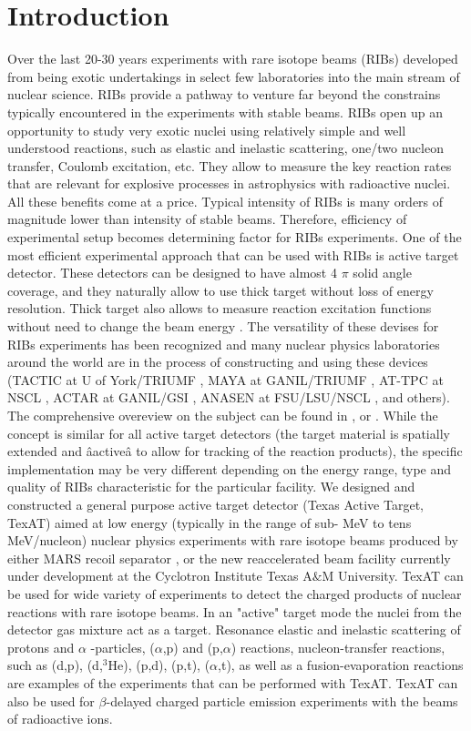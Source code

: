 \documentclass[final,number,sort&compress,5p,times,twocolumn]{elsarticle}
\begin{document}
\section{Introduction}

Over the last 20-30 years experiments with rare isotope beams (RIBs) developed from being
exotic undertakings in select few laboratories into the main stream of nuclear science. RIBs provide a
pathway to venture far beyond the constrains typically encountered in the experiments with stable beams.
RIBs open up an opportunity to study very exotic nuclei using relatively simple and well understood
reactions, such as elastic and inelastic scattering, one/two nucleon transfer, Coulomb excitation, etc. They
allow to measure the key reaction rates that are relevant for explosive processes in astrophysics with
radioactive nuclei. All these benefits come at a price. Typical intensity of RIBs is many orders of
magnitude lower than intensity of stable beams. Therefore, efficiency of experimental setup becomes
determining factor for RIBs experiments. One of the most efficient experimental approach that can be
used with RIBs is active target detector. These detectors can be designed to have almost 4 $\pi$  solid angle
coverage, and they naturally allow to use thick target without loss of energy resolution. Thick target also
allows to measure reaction excitation functions without need to change the beam energy \cite{Goldberg} . The versatility
of these devises for RIBs experiments has been recognized and many nuclear physics laboratories around
the world are in the process of constructing and using these devices (TACTIC at U of York/TRIUMF \cite{TACTIC},
MAYA at GANIL/TRIUMF \cite{MAYA}, AT-TPC at NSCL \cite{AT-TPC}, ACTAR at GANIL/GSI \cite{ACTAR}, ANASEN  at
FSU/LSU/NSCL \cite{ANASEN}, and others). The comprehensive overeview on the subject  can be found in \cite{TPC_Review}, or  \cite{Ayyad2018}.
While the concept is similar for all active target detectors (the target material is spatially extended and âactiveâ to allow
for tracking of the reaction products), the specific implementation may be very different depending on the energy range, 
type and quality of RIBs characteristic for the particular facility.
We designed and constructed a general purpose active target detector (Texas Active Target, TexAT) aimed at low energy (typically in the 
range of sub- MeV to tens MeV/nucleon) nuclear physics experiments with rare isotope beams produced by either MARS recoil separator \cite{MARS}, 
 or the new reaccelerated beam facility currently under development  at the Cyclotron Institute Texas A$\&$M University. 
TexAT can be used for wide variety of experiments to detect the charged products of nuclear reactions with rare  isotope beams. 
In an "active" target mode the nuclei from the detector gas mixture act as a target. Resonance elastic and inelastic scattering
of protons and  $\alpha$ -particles, ($\alpha$,p) and (p,$\alpha$) reactions, nucleon-transfer reactions, such as (d,p), 
(d,$^3$He), (p,d), (p,t), ($\alpha$,t), as well as a fusion-evaporation reactions are examples of the experiments that can be performed with TexAT. TexAT can also be used for $\beta$-delayed charged particle emission experiments with the beams of radioactive ions.
\end{document}
